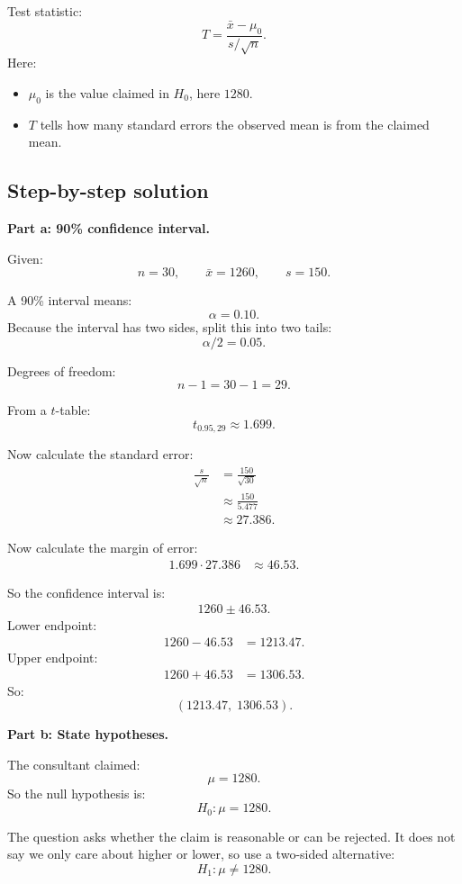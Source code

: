 \documentclass[11pt,a4paper]{article}
\begin{document}
Test statistic:
\[
T=\frac{\bar{x}-\mu_0}{s/\sqrt{n}}.
\]
Here:
\begin{itemize}[leftmargin=*]
    \item \(\mu_0\) is the value claimed in \(H_0\), here \(1280\).
    \item \(T\) tells how many standard errors the observed mean is from the claimed mean.
\end{itemize}

\subsection*{Step-by-step solution}
\textbf{Part a: 90\% confidence interval.}

Given:
\[
n=30,\qquad \bar{x}=1260,\qquad s=150.
\]

A 90\% interval means:
\[
\alpha=0.10.
\]
Because the interval has two sides, split this into two tails:
\[
\alpha/2=0.05.
\]

Degrees of freedom:
\[
n-1=30-1=29.
\]

From a \(t\)-table:
\[
t_{0.95,29}\approx 1.699.
\]

Now calculate the standard error:
\begin{align*}
\frac{s}{\sqrt{n}}
&=\frac{150}{\sqrt{30}}\\
&\approx \frac{150}{5.477}\\
&\approx 27.386.
\end{align*}

Now calculate the margin of error:
\begin{align*}
1.699\cdot 27.386
&\approx 46.53.
\end{align*}

So the confidence interval is:
\begin{align*}
1260\pm 46.53.
\end{align*}
Lower endpoint:
\begin{align*}
1260-46.53&=1213.47.
\end{align*}
Upper endpoint:
\begin{align*}
1260+46.53&=1306.53.
\end{align*}
So:
\[
(1213.47,\;1306.53).
\]

\textbf{Part b: State hypotheses.}

The consultant claimed:
\[
\mu=1280.
\]
So the null hypothesis is:
\[
H_0:\mu=1280.
\]

The question asks whether the claim is reasonable or can be rejected. It does not say we only care about higher or lower, so use a two-sided alternative:
\[
H_1:\mu\ne 1280.
\]
\end{document}
